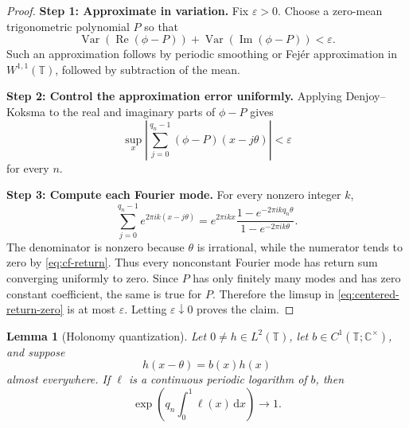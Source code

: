 \documentclass[reqno]{amsart}
\newtheorem{lemma}[theorem]{Lemma}
\theoremstyle{remark}
\numberwithin{equation}{section}
\newcommand{\T}{\mathbb{T}}
\newcommand{\C}{\mathbb{C}}
\newcommand{\Var}{\operatorname{Var}}
\newcommand{\dd}{\,\mathrm{d}}
\begin{document}
\begin{proof}
\textbf{Step 1: Approximate in variation.}
Fix \(\varepsilon>0\). Choose a zero-mean trigonometric polynomial \(P\) so
that
\[
  \Var(\operatorname{Re}(\phi-P))
  +\Var(\operatorname{Im}(\phi-P))<\varepsilon.
\]
Such an approximation follows by periodic smoothing or Fej\'er
approximation in \(W^{1,1}(\T)\), followed by subtraction of the mean.

\smallskip
\noindent
\textbf{Step 2: Control the approximation error uniformly.}
Applying Denjoy--Koksma to the real and imaginary parts of \(\phi-P\) gives
\[
  \sup_x
  \left|
    \sum_{j=0}^{q_n-1}(\phi-P)(x-j\theta)
  \right|<\varepsilon
\]
for every \(n\).

\smallskip
\noindent
\textbf{Step 3: Compute each Fourier mode.}
For every nonzero integer \(k\),
\[
  \sum_{j=0}^{q_n-1}e^{2\pi i k(x-j\theta)}
  =e^{2\pi i kx}
   \frac{1-e^{-2\pi i kq_n\theta}}
        {1-e^{-2\pi i k\theta}}.
\]
The denominator is nonzero because \(\theta\) is irrational, while the
numerator tends to zero by \eqref{eq:cf-return}. Thus every nonconstant
Fourier mode has return sum converging uniformly to zero. Since \(P\) has
only finitely many modes and has zero constant coefficient, the same is true
for \(P\). Therefore the limsup in \eqref{eq:centered-return-zero} is at most
\(\varepsilon\). Letting \(\varepsilon\downarrow0\) proves the claim.
\end{proof}

\begin{lemma}[Holonomy quantization]
\label{lem:holonomy-quantization}
Let \(0\neq h\in L^2(\T)\), let \(b\in C^1(\T;\C^\times)\), and suppose
\[
  h(x-\theta)=b(x)h(x)
\]
almost everywhere. If \(\ell\) is a continuous periodic logarithm of \(b\),
then
\begin{equation}
  \exp\left(q_n\int_0^1\ell(x)\dd x\right)
  \longrightarrow1.
  \label{eq:holonomy-quantization}
\end{equation}
\end{lemma}
\end{document}
